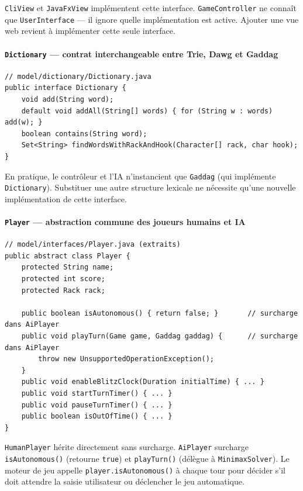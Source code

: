 \documentclass[a4paper]{article}
\begin{document}
\texttt{CliView} et \texttt{JavaFxView} implémentent cette interface. \texttt{GameController} ne connaît que \texttt{UserInterface} --- il ignore quelle implémentation est active. Ajouter une vue web revient à implémenter cette seule interface.

\paragraph{\texttt{Dictionary} --- contrat interchangeable entre Trie, Dawg et Gaddag}
\begin{verbatim}
// model/dictionary/Dictionary.java
public interface Dictionary {
    void add(String word);
    default void addAll(String[] words) { for (String w : words) add(w); }
    boolean contains(String word);
    Set<String> findWordsWithRackAndHook(Character[] rack, char hook);
}
\end{verbatim}

En pratique, le contrôleur et l'IA n'instancient que \texttt{Gaddag} (qui implémente \texttt{Dictionary}). Substituer une autre structure lexicale ne nécessite qu'une nouvelle implémentation de cette interface.

\paragraph{\texttt{Player} --- abstraction commune des joueurs humains et IA}
\begin{verbatim}
// model/interfaces/Player.java (extraits)
public abstract class Player {
    protected String name;
    protected int score;
    protected Rack rack;

    public boolean isAutonomous() { return false; }       // surcharge dans AiPlayer
    public void playTurn(Game game, Gaddag gaddag) {      // surcharge dans AiPlayer
        throw new UnsupportedOperationException();
    }
    public void enableBlitzClock(Duration initialTime) { ... }
    public void startTurnTimer() { ... }
    public void pauseTurnTimer() { ... }
    public boolean isOutOfTime() { ... }
}
\end{verbatim}

\texttt{HumanPlayer} hérite directement sans surcharge. \texttt{AiPlayer} surcharge \texttt{isAutonomous()} (retourne \texttt{true}) et \texttt{playTurn()} (délègue à \texttt{MinimaxSolver}). Le moteur de jeu appelle \texttt{player.isAutonomous()} à chaque tour pour décider s'il doit attendre la saisie utilisateur ou déclencher le jeu automatique.
\end{document}
